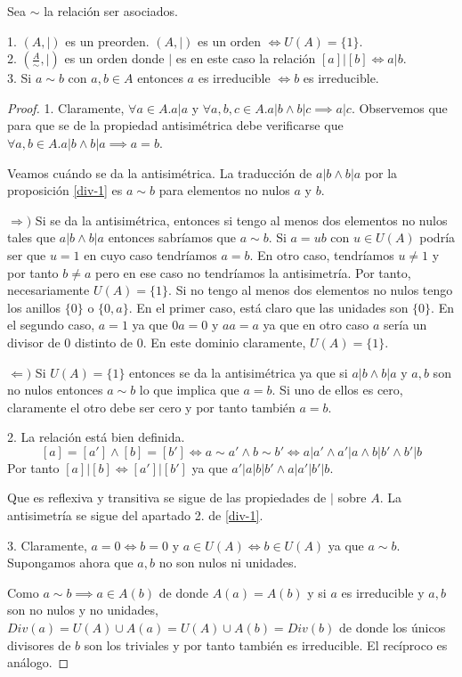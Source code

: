 \begin{proposition}
Sea $\sim$ la relación ser asociados. 

1. $(A,|)$ es un preorden. $(A,|)$ es un orden $\iff U(A) = \{1\}$.\\
2. $(\frac{A}{\sim},|)$ es un orden donde $|$ es en este caso la relación $[a]|[b] \iff a|b$.\\
3. Si $a \sim b$ con $a,b \in A$ entonces $a$ es irreducible $\iff b$ es irreducible. 
\end{proposition}
\begin{proof}
1. Claramente, $\forall a \in A. a | a$ y $\forall a,b,c \in A. a|b \land b|c \implies a|c$. Observemos que para que se de la propiedad antisimétrica debe verificarse que $\forall a,b \in A. a|b \land b|a \implies a = b$. 

Veamos cuándo se da la antisimétrica. La traducción de $a|b \land b|a$ por la proposición \ref{div-1} es $a \sim b$ para elementos no nulos $a$ y $b$. 

$\Rightarrow)$ Si se da la antisimétrica, entonces si tengo al menos dos elementos no nulos tales que $a|b \land b|a$ entonces sabríamos que $a \sim b$. Si $a = ub$ con $u \in U(A)$ podría ser que $u = 1$ en cuyo caso tendríamos $a = b$. En otro caso, tendríamos $u \neq 1$ y por tanto $b \neq a$ pero en ese caso no tendríamos la antisimetría. Por tanto, necesariamente $U(A) = \{1\}$. Si no tengo al menos dos elementos no nulos tengo los anillos $\{0\}$ o $\{0,a\}$. En el primer caso, está claro que las unidades son $\{0\}$. En el segundo caso, $a = 1$ ya que $0a = 0$ y $aa = a$ ya que en otro caso $a$ sería un divisor de $0$ distinto de $0$. En este dominio claramente, $U(A) = \{1\}$.

$\Leftarrow)$ Si $U(A) = \{1\}$ entonces se da la antisimétrica ya que si $a|b \land b|a$ y $a,b$ son no nulos entonces $a \sim b$ lo que implica que $a = b$. Si uno de ellos es cero, claramente el otro debe ser cero y por tanto también $a = b$.   

2. La relación está bien definida. $$[a] = [a'] \land [b] = [b']  \iff a \sim a' \land b \sim b' \iff a|a' \land a'|a \land b|b' \land b'|b$$ Por tanto $[a]|[b] \iff [a']|[b']$ ya que $a'|a|b|b' \land a|a'|b'|b$. 

Que es reflexiva y transitiva se sigue de las propiedades de $|$ sobre $A$. La antisimetría se sigue del apartado 2. de \ref{div-1}.

3. Claramente, $a = 0 \iff b = 0$ y $a \in U(A) \iff b \in U(A)$ ya que $a \sim b$. Supongamos ahora que $a,b$ no son nulos ni unidades.  

Como $a \sim b \implies a \in A(b)$ de donde $A(a) = A(b)$ y si $a$ es irreducible y $a,b$ son no nulos y no unidades, $Div(a) = U(A) \cup A(a) = U(A) \cup A(b) = Div(b)$ de donde los únicos divisores de $b$ son los triviales y por tanto también es irreducible. El recíproco es análogo. 
\end{proof}

